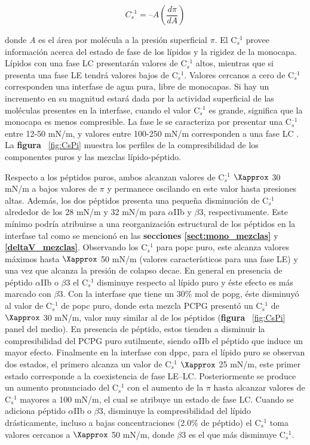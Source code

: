 \begin{equation}\label{ecu:Cs}
    C_s^{\text{--}1} =  \text{--} A \left(\frac{d\pi}{dA} \right)  
\end{equation}

donde \textit{A} es el área por molécula a la presión superficial  $\pi$. El C$_s^{\text{--}1}$ provee información acerca del estado de fase de los lípidos y la rigidez de la monocapa. Lípidos con una fase LC presentarán valores de C$_s^{\text{--}1}$ altos, mientras que si presenta una fase LE tendrá valores bajos de C$_s^{\text{--}1}$. Valores cercanos a cero de C$_s^{\text{--}1}$ corresponden una interfase de agua pura, libre de monocapas. Si hay un incremento en su magnitud estará dada por la actividad superficial de las moléculas presentes en la interfase, cuando el valor C$_s^{\text{--}1}$ es grande, significa que la monocapa es menos compresible. La fase \ac{le} se caracteriza por presentar una C$_s^{\text{--}1}$ entre 12-50 mN/m, y valores entre 100-250 mN/m corresponden a una fase LC \citep{Davies1961}. La \textbf{figura} ~\ref{fig:CsPi} muestra los perfiles de la compresibilidad de los componentes puros y las mezclas lípido-péptido.

Respecto a los péptidos puros, ambos alcanzan valores de C$_s^{\text{--}1}$ $\Xapprox$  30 mN/m a bajos valores de $\pi$ y permanece oscilando en este valor hasta presiones altas. Además, los dos péptidos presenta una pequeña disminución de C$_s^{\text{--}1}$ alrededor de los 28 mN/m y 32 mN/m para $\alpha$IIb y $\beta$3, respectivamente. Este mínimo podría atribuirse a una reorganización estructural de los péptidos en la interfase tal como se mencionó en las \textbf{secciones \ref{sect:mono_mezclas}} y \textbf{\ref{deltaV_mezclas}}. Observando los C$_s^{\text{--}1}$ para \ac{popc} puro, este alcanza valores máximos hasta $\Xapprox$ 50 mN/m (valores característicos para una fase LE) y una vez que alcanza la presión de colapso decae. En general en presencia de péptido $\alpha$IIb  o $\beta$3 el C$_s^{\text{--}1}$ disminuye respecto al lípido puro y éste efecto es más marcado con $\beta$3. 
Con la interfase que tiene un 30\% mol de \ac{popg}, éste disminuyó al valor de C$_s^{\text{--}1}$ de \ac{popc} puro, donde esta mezcla PCPG presentó un C$_s^{\text{--}1}$ de  $\Xapprox$ 30 mN/m, valor muy similar al de los péptidos (\textbf{figura} ~\ref{fig:CsPi} panel del medio). En presencia de péptido, estos tienden a disminuir la compresibilidad del PCPG puro sutilmente, siendo $\alpha$IIb  el péptido que induce un mayor efecto.
Finalmente en la interfase con \ac{dppc}, para el lípido puro se observan dos estados, el primero alcanza un valor de C$_s^{\text{--}1}$  $\Xapprox$ 25 mN/m, este primer estado corresponde a la coexistencia de fase LE--LC. Posteriormente se produce un aumento pronunciado del C$_s^{\text{--}1}$ con el aumento de la $\pi$ hasta alcanzar valores de C$_s^{\text{--}1}$  mayores a 100 mN/m, el cual se atribuye un estado de fase LC. Cuando se adiciona péptido $\alpha$IIb o $\beta$3, disminuye la compresibilidad del lípido drásticamente, incluso a bajas concentraciones (2.0\% de péptido) el C$_s^{\text{--}1}$ toma valores cercanos a $\Xapprox$ 50 mN/m, donde $\beta$3 es el que más disminuye C$_s^{\text{--}1}$.

